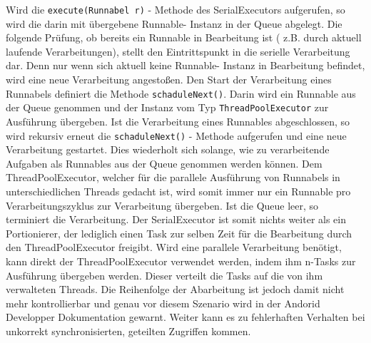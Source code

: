 \documentclass[12pt,oneside,a4paper,bibtotoc,liststotoc]{scrreprt}
\begin{document}
Wird die \texttt{execute(Runnabel r)} - Methode des SerialExecutors aufgerufen, so wird die darin mit übergebene Runnable- Instanz in der Queue abgelegt. Die folgende Prüfung, ob bereits ein Runnable in Bearbeitung ist ( z.B. durch aktuell laufende Verarbeitungen), stellt den Eintrittspunkt in die serielle Verarbeitung dar. Denn nur wenn sich aktuell keine Runnable- Instanz in Bearbeitung befindet, wird eine neue Verarbeitung angestoßen. Den Start der Verarbeitung eines Runnabels definiert die Methode \texttt{schaduleNext()}. Darin wird ein Runnable aus der Queue genommen und der Instanz vom Typ \texttt{ThreadPoolExecutor} zur Ausführung übergeben. Ist die Verarbeitung eines Runnables abgeschlossen, so wird rekursiv erneut die \texttt{schaduleNext()} - Methode aufgerufen und eine neue Verarbeitung gestartet. Dies wiederholt sich solange, wie zu verarbeitende Aufgaben als Runnables aus der Queue genommen werden können.  Dem ThreadPoolExecutor, welcher für die parallele Ausführung von Runnabels in unterschiedlichen Threads gedacht ist, wird somit immer nur ein Runnable pro Verarbeitungszyklus zur Verarbeitung übergeben. Ist die Queue leer, so terminiert die Verarbeitung. Der SerialExecutor ist somit nichts weiter als ein Portionierer, der lediglich einen Task zur selben Zeit für die Bearbeitung durch den ThreadPoolExecutor freigibt.\newline
Wird eine parallele Verarbeitung benötigt, kann direkt der ThreadPoolExecutor verwendet werden, indem ihm n-Tasks zur Ausführung übergeben werden. Dieser verteilt die Tasks auf die von ihm verwalteten Threads. Die Reihenfolge der Abarbeitung ist jedoch damit nicht mehr kontrollierbar und genau vor diesem Szenario wird in der Andorid Developper Dokumentation gewarnt. Weiter kann es zu fehlerhaften Verhalten bei unkorrekt synchronisierten, geteilten Zugriffen kommen.\newline
\end{document}
